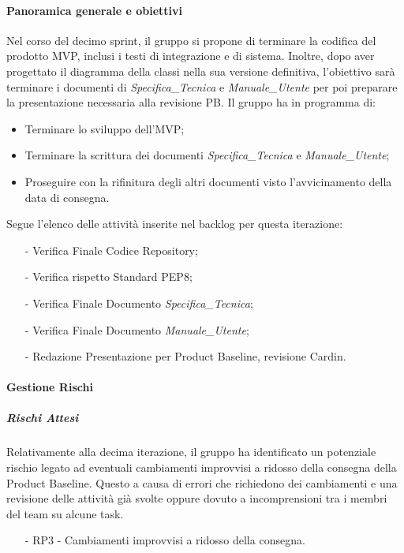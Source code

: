 \documentclass[10pt]{article}
\begin{document}
{{{{{{{{{{{            \paragraph{Panoramica generale e obiettivi}\mbox{}\vspace{0.4em}
            Nel corso del decimo sprint, il gruppo si propone di terminare la codifica del prodotto MVP, inclusi i testi di integrazione e di sistema. Inoltre, dopo aver progettato il diagramma della classi nella sua versione definitiva, l'obiettivo sarà terminare i documenti di \textit{Specifica\_Tecnica} e \textit{Manuale\_Utente} per poi preparare la presentazione necessaria alla revisione PB.
            Il gruppo ha in programma di:
            \begin{itemize}
                \item Terminare lo sviluppo dell'MVP;
                \item Terminare la scrittura dei documenti \textit{Specifica\_Tecnica} e \textit{Manuale\_Utente};
                \item Proseguire con la rifinitura degli altri documenti visto l'avvicinamento della data di consegna.
            \end{itemize}
            Segue l'elenco delle attività inserite nel backlog per questa iterazione:
            \vspace{-0.5em}
            \begin{itemize}
            \setlength\itemsep{-0.2em}
                \item [-] Verifica Finale Codice Repository;
                \item [-] Verifica rispetto Standard PEP8;
                \item [-] Verifica Finale Documento \textit{Specifica\_Tecnica};
                \item [-] Verifica Finale Documento \textit{Manuale\_Utente};
                \item [-] Redazione Presentazione per Product Baseline, revisione Cardin.
            \end{itemize}
    
            \paragraph{Gestione Rischi}\mbox{}
            \vspace{-1em}
            \subparagraph*{Rischi Attesi}\mbox{}
            
            Relativamente alla decima iterazione, il gruppo ha identificato un potenziale rischio legato ad eventuali cambiamenti improvvisi a ridosso della consegna della Product Baseline. Questo a causa di errori che richiedono dei cambiamenti e una revisione delle attività già svolte oppure dovuto a incomprensioni tra i membri del team su alcune task.
            \vspace{-0.5em}
            \begin{itemize}
            \setlength\itemsep{-0.2em}
            \item [-]  RP3 - Cambiamenti improvvisi a ridosso della consegna.
            \end{itemize}
    
}}}}}}}}}}}
\end{document}
